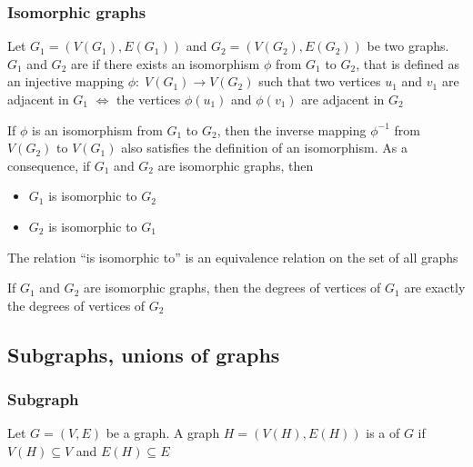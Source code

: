 \documentclass[aspectratio=43]{beamer}
\begin{document}
\begin{frame} \frametitle{Isomorphic graphs} 
\begin{definition}
Let $G_1=(V(G_1),E(G_1))$ and $G_2=(V(G_2),E(G_2))$ be two graphs.
$G_1$ and $G_2$ are  if there exists an isomorphism $\phi$ from $G_1$ to $G_2$, that is defined as an injective mapping $\phi:\; V(G_1) \rightarrow V(G_2)$ such that two vertices $u_1$ and $v_1$ are adjacent in $G_1$ $\iff$ the vertices $\phi(u_1)$ and $\phi(v_1)$ are adjacent in $G_2$
\end{definition}
\end{frame}
 
 
 
\begin{frame}
If $\phi$ is an isomorphism from $G_1$ to $G_2$, then the inverse mapping $\phi ^{-1}$ from $V(G_2)$ to $V(G_1)$ also satisfies the definition of an isomorphism.
As a consequence, if $G_1$ and $G_2$ are isomorphic graphs, then
\begin{itemize}
\item $G_1$ is isomorphic to $G_2$
\item $G_2$ is isomorphic to $G_1$
\end{itemize}
\vfill
\begin{theorem}
The relation ``is isomorphic to'' is an equivalence relation on the set of all graphs
\end{theorem}
\vfill
\begin{theorem}
If $G_1$ and $G_2$ are isomorphic graphs, then the degrees of vertices of $G_1$ are exactly the degrees of vertices of $G_2$
\end{theorem}
\end{frame}



\subsection{Subgraphs, unions of graphs}

\begin{frame}\frametitle{Subgraph}
\begin{definition}[Subgraph]
Let $G=(V,E)$ be a graph.
A graph $H=(V(H),E(H))$ is a  of $G$ if $V(H)\subseteq V$ and $E(H)\subseteq E$
\end{definition}
\end{frame}
\end{document}
